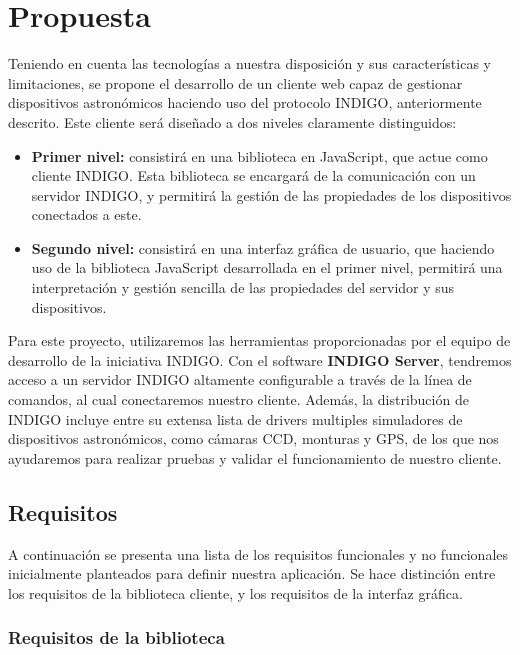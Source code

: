 \section{Propuesta}

Teniendo en cuenta las tecnologías a nuestra disposición y sus características y limitaciones, se propone el desarrollo de un cliente web capaz de gestionar dispositivos astronómicos haciendo uso del protocolo INDIGO, anteriormente descrito. Este cliente será diseñado a dos niveles claramente distinguidos:

\begin{itemize}
  \item \textbf{Primer nivel:} consistirá en una biblioteca en JavaScript, que actue como cliente INDIGO. Esta biblioteca se encargará de la comunicación con un servidor INDIGO, y permitirá la gestión de las propiedades de los dispositivos conectados a este.
  \item \textbf{Segundo nivel:} consistirá en una interfaz gráfica de usuario, que haciendo uso de la biblioteca JavaScript desarrollada en el primer nivel, permitirá una interpretación y gestión sencilla de las propiedades del servidor y sus dispositivos.
\end{itemize}


Para este proyecto, utilizaremos las herramientas proporcionadas por el equipo de desarrollo de la iniciativa INDIGO. Con el software \textbf{INDIGO Server}, tendremos acceso a un servidor INDIGO altamente configurable a través de la línea de comandos, al cual conectaremos nuestro cliente. Además, la distribución de INDIGO incluye entre su extensa lista de drivers multiples simuladores de dispositivos astronómicos, como cámaras CCD, monturas y GPS, de los que nos ayudaremos para realizar pruebas y validar el funcionamiento de nuestro cliente.

\subsection{Requisitos}

A continuación se presenta una lista de los requisitos funcionales y no funcionales inicialmente planteados para definir nuestra aplicación. Se hace distinción entre los requisitos de la biblioteca cliente, y los requisitos de la interfaz gráfica.

\subsubsection{Requisitos de la biblioteca}


